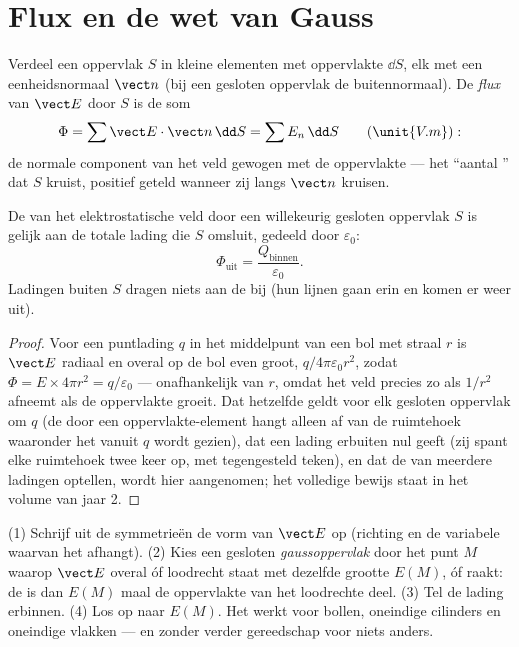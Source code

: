 \section{Flux en de wet van Gauss}

\begin{definition}\label{def:b1:electrostatics-gauss:flux}
Verdeel een oppervlak $S$ in kleine elementen met oppervlakte $\dd S$, elk met een
eenheidsnormaal $\vect n$ (bij een gesloten oppervlak de buitennormaal). De
\emph{flux} van $\vect E$ door $S$ is de som
\[
\Phi = \sum \vect E\cdot\vect n\,\dd S = \sum E_n\,\dd S \qquad (\unit{V.m}):
\]
de normale component van het veld gewogen met de oppervlakte --- het ``aantal
'' dat $S$ kruist, positief geteld wanneer zij langs
$\vect n$ kruisen.
\end{definition}

\begin{theorem}\label{thm:b1:electrostatics-gauss:gauss}
De  van het elektrostatische veld door een willekeurig gesloten oppervlak $S$
is gelijk aan de totale lading die $S$ omsluit, gedeeld door $\varepsilon_0$:
\[
\Phi_{\text{uit}} = \frac{Q_{\text{binnen}}}{\varepsilon_0} .
\]
Ladingen buiten $S$ dragen niets aan de  bij (hun lijnen gaan erin
en komen er weer uit).
\end{theorem}

\begin{proof}
Voor een puntlading $q$ in het middelpunt van een bol met straal $r$ is
$\vect E$ radiaal en overal op de bol even groot, $q/4\pi\varepsilon_0r^2$,
zodat $\Phi = E \times 4\pi r^2 = q/\varepsilon_0$ --- onafhankelijk van $r$,
omdat het veld precies zo als $1/r^2$ afneemt als de oppervlakte groeit. Dat
hetzelfde geldt voor elk gesloten oppervlak om $q$ (de  door een
oppervlakte-element hangt alleen af van de ruimtehoek waaronder het vanuit $q$ wordt gezien),
dat een lading erbuiten nul geeft (zij spant elke ruimtehoek twee keer op,
met tegengesteld teken), en dat de  van meerdere ladingen optellen, wordt
hier aangenomen; het volledige bewijs staat in het volume van jaar 2.
\end{proof}

\begin{method}\label{meth:b1:electrostatics-gauss:gauss}
(1) Schrijf uit de symmetrieën de vorm van $\vect E$ op (richting en de
variabele waarvan het afhangt). (2) Kies een gesloten \emph{gaussoppervlak}
door het punt $M$ waarop $\vect E$ overal óf loodrecht staat met
dezelfde grootte $E(M)$, óf raakt: de  is dan $E(M)$ maal de
oppervlakte van het loodrechte deel. (3) Tel de lading erbinnen. (4) Los op naar
$E(M)$. Het werkt voor bollen, oneindige cilinders en oneindige vlakken
--- en zonder verder gereedschap voor niets anders.
\end{method}

